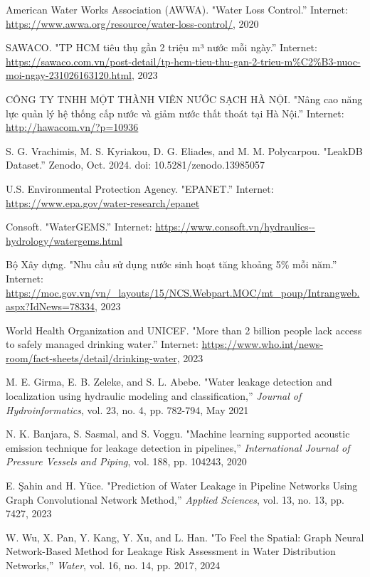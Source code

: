 \begin{thebibliography}{99}
American Water Works Association (AWWA). "Water Loss Control.'' Internet: \url{https://www.awwa.org/resource/water-loss-control/}, 2020

SAWACO. "TP HCM tiêu thụ gần 2 triệu m³ nước mỗi ngày.'' Internet: \url{https://sawaco.com.vn/post-detail/tp-hcm-tieu-thu-gan-2-trieu-m%C2%B3-nuoc-moi-ngay-231026163120.html}, 2023

CÔNG TY TNHH MỘT THÀNH VIÊN NƯỚC SẠCH HÀ NỘI. "Nâng cao năng lực quản lý hệ thống cấp nước và giảm nước thất thoát tại Hà Nội.'' Internet: \url{http://hawacom.vn/?p=10936}

S. G. Vrachimis, M. S. Kyriakou, D. G. Eliades, and M. M. Polycarpou. "LeakDB Dataset.'' Zenodo, Oct. 2024. doi: 10.5281/zenodo.13985057

U.S. Environmental Protection Agency. "EPANET.'' Internet: \url{https://www.epa.gov/water-research/epanet}

Consoft. "WaterGEMS.'' Internet: \url{https://www.consoft.vn/hydraulics--hydrology/watergems.html}

Bộ Xây dựng. "Nhu cầu sử dụng nước sinh hoạt tăng khoảng 5\% mỗi năm.'' Internet: \url{https://moc.gov.vn/vn/_layouts/15/NCS.Webpart.MOC/mt_poup/Intrangweb.aspx?IdNews=78334}, 2023

World Health Organization and UNICEF. "More than 2 billion people lack access to safely managed drinking water.'' Internet: \url{https://www.who.int/news-room/fact-sheets/detail/drinking-water}, 2023

M. E. Girma, E. B. Zeleke, and S. L. Abebe. "Water leakage detection and localization using hydraulic modeling and classification,'' \textit{Journal of Hydroinformatics}, vol. 23, no. 4, pp. 782-794, May 2021

N. K. Banjara, S. Sasmal, and S. Voggu. "Machine learning supported acoustic emission technique for leakage detection in pipelines,'' \textit{International Journal of Pressure Vessels and Piping}, vol. 188, pp. 104243, 2020

E. Şahin and H. Yüce. "Prediction of Water Leakage in Pipeline Networks Using Graph Convolutional Network Method,'' \textit{Applied Sciences}, vol. 13, no. 13, pp. 7427, 2023

W. Wu, X. Pan, Y. Kang, Y. Xu, and L. Han. "To Feel the Spatial: Graph Neural Network-Based Method for Leakage Risk Assessment in Water Distribution Networks,'' \textit{Water}, vol. 16, no. 14, pp. 2017, 2024


\end{thebibliography}
